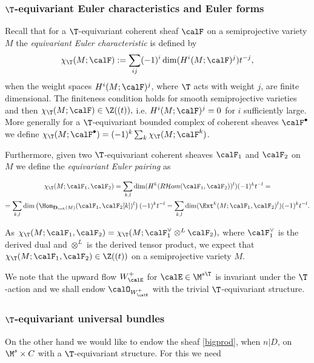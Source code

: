 \subsubsection{$\T$-equivariant Euler characteristics and Euler forms}
\label{equivarianteuler}
Recall that for a $\T$-equivariant coherent sheaf $\calF$ on a semiprojective variety $M$ the {\em equivariant Euler characteristic} is defined by
$$\chi_\T(M;\calF):=\sum_{ij} (-1)^i \dim(H^i(M;\calF)^{j}) t^{-j},$$
when the weight spaces $H^i(M;\calF)^{j}$, where $\T$ acts with weight $j$, are finite dimensional. The finiteness condition holds for smooth semiprojective varieties and  then $\chi_\T(M;\calF)\in \Z((t)),$ i.e.  $H^i(M;\calF)^j=0$ for $i$ sufficiently large. More generally for a $\T$-equivariant bounded complex of coherent sheaves $\calF^\bullet$ we define $\chi_\T(M;\calF^\bullet)=(-1)^k\sum_k \chi_\T(M;\calF^k)$.

Furthermore, given two $\T$-equivariant coherent sheaves $\calF_1$ and $\calF_2$ on $M$ we define the {\em equivariant Euler pairing} as

\begin{multline*}\chi_\T(M;\calF_1,\calF_2)=\sum_{k,l} \dim(H^k({ R} {\mathcal Hom}(\calF_1,\calF_2))^l) (-1)^k t^{-l}=\\ =\sum_{k,l} \dim\left(\Hom_{{\mathbf D}_{coh}(M)}(\calF_1,\calF_2[k])^l\right) (-1)^k t^{-l}=\sum_{k,l} \dim(\Ext^k(M;\calF_1,\calF_2)^l) (-1)^k t^{-l} .\end{multline*}

As $\chi_\T(M;\calF_1,\calF_2)=\chi_\T(M;\calF_1^\vee\otimes^L\calF_2),$ where $\calF_1^\vee$ is the derived dual and $\otimes^L$ is the derived tensor product, we expect that  $\chi_\T(M;\calF_1,\calF_2)\in \Z((t))$ on a semiprojective variety $M$.

We note that the upward flow $W^+_\calE$ for $\calE\in \M^{s\T}$ is invariant under the $\T$-action and we shall endow $\calO_{W^+_\calE}$  with the trivial $\T$-equivariant structure.
\subsubsection{$\T$-equivariant universal bundles}
\label{equiuni}
On the other hand we would like to endow the  sheaf \eqref{bigprod}, when $n|D$,  on $\M^s\times C$ with a $\T$-equivariant structure. For this we need

